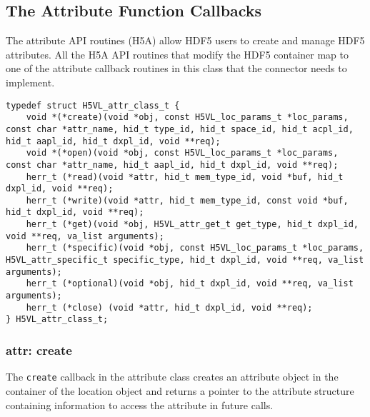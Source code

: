 
\subsection{The Attribute Function Callbacks}
The attribute API routines (H5A) allow HDF5 users to create and manage
HDF5 attributes. All the H5A API routines that modify the HDF5
container map to one of the attribute callback routines in this
class that the connector needs to implement.

\begin{lstlisting}[caption={Structure for attribute callback routines, H5VLconnector.h}, captionpos=b, label={lst:ATTRclass}]
typedef struct H5VL_attr_class_t {                                               
    void *(*create)(void *obj, const H5VL_loc_params_t *loc_params, const char *attr_name, hid_t type_id, hid_t space_id, hid_t acpl_id, hid_t aapl_id, hid_t dxpl_id, void **req);
    void *(*open)(void *obj, const H5VL_loc_params_t *loc_params, const char *attr_name, hid_t aapl_id, hid_t dxpl_id, void **req);
    herr_t (*read)(void *attr, hid_t mem_type_id, void *buf, hid_t dxpl_id, void **req);
    herr_t (*write)(void *attr, hid_t mem_type_id, const void *buf, hid_t dxpl_id, void **req);
    herr_t (*get)(void *obj, H5VL_attr_get_t get_type, hid_t dxpl_id, void **req, va_list arguments);
    herr_t (*specific)(void *obj, const H5VL_loc_params_t *loc_params, H5VL_attr_specific_t specific_type, hid_t dxpl_id, void **req, va_list arguments);            
    herr_t (*optional)(void *obj, hid_t dxpl_id, void **req, va_list arguments); 
    herr_t (*close) (void *attr, hid_t dxpl_id, void **req);                     
} H5VL_attr_class_t; 
\end{lstlisting}

\subsubsection{attr: create}
The \texttt{create} callback in the attribute class creates an
attribute object in the container of the location object and
returns a pointer to the attribute structure containing information to
access the attribute in future calls. \bigskip

